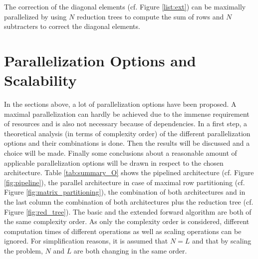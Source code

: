 \documentclass[mscthesis]{usiinfthesis}
\begin{document}
The correction of the diagonal elements (cf. Figure \ref{list:ext}) can be
maximally parallelized by using $N$ reduction trees to compute the sum of rows
and $N$ subtracters to correct the diagonal elements.

\section{Parallelization Options and Scalability}
\label{ch:analysis_all}

In the sections above, a lot of parallelization options have been proposed.
A maximal parallelization can hardly be achieved due to the immense requirement
of resources and is also not necessary because of dependencies. In a first
step, a theoretical analysis (in terms of complexity order) of the different
parallelization options and their combinations is done. Then the results will
be discussed and a choice will be made. Finally some conclusions about
a reasonable amount of applicable parallelization options will be drawn in
respect to the chosen architecture. Table \ref{tab:summary_O} shows the
pipelined architecture (cf.  Figure \ref{fig:pipeline}), the parallel
architecture in case of maximal row partitioning (cf. Figure
\ref{fig:matrix_partitioning}), the combination of both architectures and in
the last column the combination of both architectures plus the reduction tree
(cf. Figure \ref{fig:red_tree}). The basic and the extended forward algorithm
are both of the same complexity order. As only the complexity order is
considered, different computation times of different operations as well as
scaling operations can be ignored. For simplification reasons, it is assumed that
$N=L$ and that by scaling the problem, $N$ and $L$ are both changing in the
same order.
\end{document}
